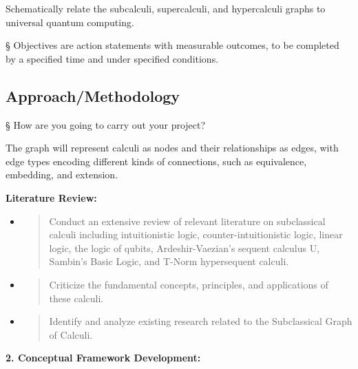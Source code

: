 Schematically relate the subcalculi, supercalculi, and hypercalculi
graphs to universal quantum computing.

§ Objectives are action statements with measurable outcomes, to be
completed by a specified time and under specified conditions.

\hypertarget{approachmethodology}{%
\subsection{Approach/Methodology}\label{approachmethodology}}

§ How are you going to carry out your project?

The graph will represent calculi as nodes and their relationships as
edges, with edge types encoding different kinds of connections, such as
equivalence, embedding, and extension.

\textbf{Literature Review:}

\begin{itemize}
\item
  \begin{quote}
  Conduct an extensive review of relevant literature on subclassical
  calculi including intuitionistic logic, counter-intuitionistic logic,
  linear logic, the logic of qubits, Ardeshir-Vaezian's sequent calculus
  U, Sambin's Basic Logic, and T-Norm hypersequent calculi.
  \end{quote}
\item
  \begin{quote}
  Criticize the fundamental concepts, principles, and applications of
  these calculi.
  \end{quote}
\item
  \begin{quote}
  Identify and analyze existing research related to the Subclassical
  Graph of Calculi.
  \end{quote}
\end{itemize}

\textbf{2. Conceptual Framework Development:}

